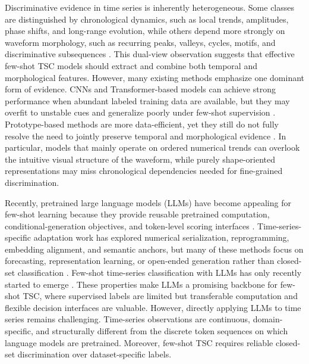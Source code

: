 \documentclass{article}
\begin{document}
Discriminative evidence in time series is inherently heterogeneous. Some classes are distinguished by chronological dynamics, such as local trends, amplitudes, phase shifts, and long-range evolution, while others depend more strongly on waveform morphology, such as recurring peaks, valleys, cycles, motifs, and discriminative subsequences \citep{tang2020interpretable,ye2009time,dempster2020rocket,fawaz2020inceptiontime,wang2015encoding}. This dual-view observation suggests that effective few-shot TSC models should extract and combine both temporal and morphological features. However, many existing methods emphasize one dominant form of evidence. CNNs and Transformer-based models can achieve strong performance when abundant labeled training data are available, but they may overfit to unstable cues and generalize poorly under few-shot supervision \citep{fawaz2020inceptiontime,dempster2020rocket,dyformer}. Prototype-based methods are more data-efficient, yet they still do not fully resolve the need to jointly preserve temporal and morphological evidence \citep{snell2017prototypical,tapnet,tang2020interpretable}. In particular, models that mainly operate on ordered numerical trends can overlook the intuitive visual structure of the waveform, while purely shape-oriented representations may miss chronological dependencies needed for fine-grained discrimination.

Recently, pretrained large language models (LLMs) have become appealing for few-shot learning because they provide reusable pretrained computation, conditional-generation objectives, and token-level scoring interfaces \citep{brown2020language,raffel2020exploring}. Time-series-specific adaptation work has explored numerical serialization, reprogramming, embedding alignment, and semantic anchors, but many of these methods focus on forecasting, representation learning, or open-ended generation rather than closed-set classification \citep{gruver2023large,zhou2023one,jin2024time,sun2023test,chang2025llm4ts,zhang2024large,jiang2024empowering,langer2025opentslm,tan2024language,zheng2024revisited}. Few-shot time-series classification with LLMs has only recently started to emerge \citep{chen2025large}. These properties make LLMs a promising backbone for few-shot TSC, where supervised labels are limited but transferable computation and flexible decision interfaces are valuable. However, directly applying LLMs to time series remains challenging. Time-series observations are continuous, domain-specific, and structurally different from the discrete token sequences on which language models are pretrained. Moreover, few-shot TSC requires reliable closed-set discrimination over dataset-specific labels.
\end{document}
